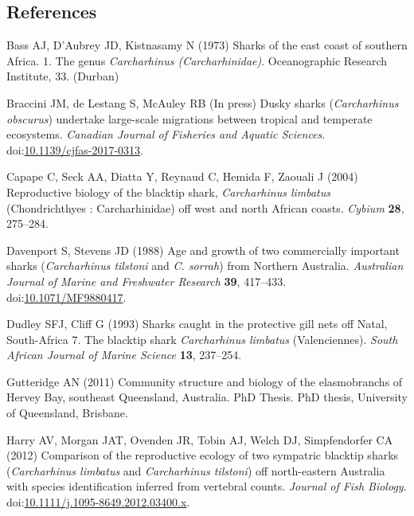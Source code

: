 \documentclass[]{article}
\begin{document}
\subsection*{References}\label{references}

\hypertarget{refs}{}
\hypertarget{ref-bass_sharks_1973}{}
Bass AJ, D'Aubrey JD, Kistnasamy N (1973) Sharks of the east coast of
southern Africa. 1. The genus \emph{Carcharhinus (Carcharhinidae)}.
Oceanographic Research Institute, 33. (Durban)

\hypertarget{ref-braccini_dusky_Inpress}{}
Braccini JM, de Lestang S, McAuley RB (In press) Dusky sharks
(\emph{Carcharhinus obscurus}) undertake large-scale migrations between
tropical and temperate ecosystems. \emph{Canadian Journal of Fisheries
and Aquatic Sciences}.
doi:\href{https://doi.org/10.1139/cjfas-2017-0313}{10.1139/cjfas-2017-0313}.

\hypertarget{ref-capape_reproductive_2004}{}
Capape C, Seck AA, Diatta Y, Reynaud C, Hemida F, Zaouali J (2004)
Reproductive biology of the blacktip shark, \emph{Carcharhinus limbatus}
(Chondrichthyes : Carcharhinidae) off west and north African coasts.
\emph{Cybium} \textbf{28}, 275--284.

\hypertarget{ref-davenport_age_1988}{}
Davenport S, Stevens JD (1988) Age and growth of two commercially
important sharks (\emph{Carcharhinus tilstoni} and \emph{C. sorrah})
from Northern Australia. \emph{Australian Journal of Marine and
Freshwater Research} \textbf{39}, 417--433.
doi:\href{https://doi.org/10.1071/MF9880417}{10.1071/MF9880417}.

\hypertarget{ref-dudley_sharks_1993}{}
Dudley SFJ, Cliff G (1993) Sharks caught in the protective gill nets off
Natal, South-Africa 7. The blacktip shark \emph{Carcharhinus limbatus}
(Valenciennes). \emph{South African Journal of Marine Science}
\textbf{13}, 237--254.

\hypertarget{ref-gutteridge_community_2011}{}
Gutteridge AN (2011) Community structure and biology of the
elasmobranchs of Hervey Bay, southeast Queensland, Australia. PhD
Thesis. PhD thesis, University of Queensland, Brisbane.

\hypertarget{ref-harry_comparison_2012}{}
Harry AV, Morgan JAT, Ovenden JR, Tobin AJ, Welch DJ, Simpfendorfer CA
(2012) Comparison of the reproductive ecology of two sympatric blacktip
sharks (\emph{Carcharhinus limbatus} and \emph{Carcharhinus tilstoni})
off north-eastern Australia with species identification inferred from
vertebral counts. \emph{Journal of Fish Biology}.
doi:\href{https://doi.org/10.1111/j.1095-8649.2012.03400.x}{10.1111/j.1095-8649.2012.03400.x}.
\end{document}
